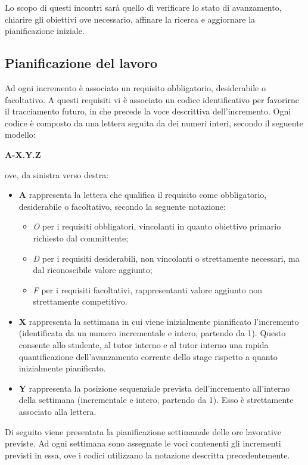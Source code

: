 Lo scopo di questi incontri sarà quello di verificare lo stato di avanzamento, chiarire gli obiettivi ove necessario, affinare la ricerca e aggiornare la pianificazione iniziale.

\subsection{Pianificazione del lavoro}

Ad ogni incremento è associato un requisito obbligatorio, desiderabile o facoltativo.
A questi requisiti vi è associato un codice identificativo per favorirne il tracciamento futuro, in che precede la voce descrittiva dell'incremento.
\noindent
Ogni codice è composto da una lettera seguita da dei numeri interi, secondo il seguente modello:
\begin{center}
	\textbf{A-X.Y.Z}
\end{center}
ove, da sinistra verso destra:
\begin{itemize}

  \item \textbf{A} rappresenta la lettera che qualifica il requisito come obbligatorio, desiderabile o facoltativo, secondo la seguente notazione:
  \begin{itemize}
  	\item \textit{O} per i requisiti obbligatori, vincolanti in quanto obiettivo primario richiesto dal committente;
  	\item \textit{D} per i requisiti desiderabili, non vincolanti o strettamente necessari,
  		  ma dal riconoscibile valore aggiunto;
  	\item \textit{F} per i requisiti facoltativi, rappresentanti valore aggiunto non strettamente
  		  competitivo.
  \end{itemize}

  \item \textbf{X} rappresenta la settimana in cui viene inizialmente pianificato l'incremento (identificata da un numero incrementale e intero, partendo da 1).
  Questo consente allo studente, al tutor interno e al tutor interno una rapida quantificazione dell'avanzamento corrente dello stage rispetto a quanto inizialmente pianificato.

  \item \textbf{Y} rappresenta la posizione sequenziale prevista dell’incremento all’interno della settimana (incrementale e intero, partendo da 1). Esso è strettamente associato alla lettera.


\end{itemize}
\noindent
Di seguito viene presentata la pianificazione settimanale delle ore lavorative previste.
Ad ogni settimana sono assegnate le voci contenenti gli incrementi previsti in essa, ove i codici utilizzano la notazione descritta precedentemente.

